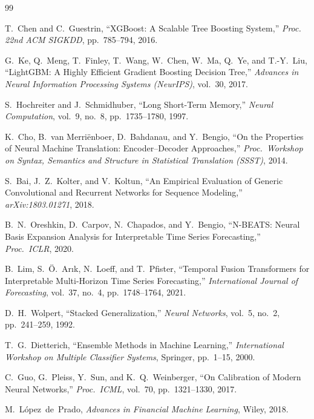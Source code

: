 \clearpage
\begin{thebibliography}{99}

T.~Chen and C.~Guestrin, ``XGBoost: A Scalable Tree Boosting System,'' \textit{Proc. 22nd ACM SIGKDD}, pp.~785--794, 2016.

G.~Ke, Q.~Meng, T.~Finley, T.~Wang, W.~Chen, W.~Ma, Q.~Ye, and T.-Y.~Liu, ``LightGBM: A Highly Efficient Gradient Boosting Decision Tree,'' \textit{Advances in Neural Information Processing Systems (NeurIPS)}, vol.~30, 2017.

S.~Hochreiter and J.~Schmidhuber, ``Long Short-Term Memory,'' \textit{Neural Computation}, vol.~9, no.~8, pp.~1735--1780, 1997.

K.~Cho, B.~van Merri\"enboer, D.~Bahdanau, and Y.~Bengio, ``On the Properties of Neural Machine Translation: Encoder--Decoder Approaches,'' \textit{Proc.\ Workshop on Syntax, Semantics and Structure in Statistical Translation (SSST)}, 2014.

S.~Bai, J.~Z.~Kolter, and V.~Koltun, ``An Empirical Evaluation of Generic Convolutional and Recurrent Networks for Sequence Modeling,'' \textit{arXiv:1803.01271}, 2018.

B.~N.~Oreshkin, D.~Carpov, N.~Chapados, and Y.~Bengio, ``N-BEATS: Neural Basis Expansion Analysis for Interpretable Time Series Forecasting,'' \textit{Proc.\ ICLR}, 2020.

B.~Lim, S.~\"O.~Ar\i k, N.~Loeff, and T.~Pfister, ``Temporal Fusion Transformers for Interpretable Multi-Horizon Time Series Forecasting,'' \textit{International Journal of Forecasting}, vol.~37, no.~4, pp.~1748--1764, 2021.

D.~H.~Wolpert, ``Stacked Generalization,'' \textit{Neural Networks}, vol.~5, no.~2, pp.~241--259, 1992.

T.~G.~Dietterich, ``Ensemble Methods in Machine Learning,'' \textit{International Workshop on Multiple Classifier Systems}, Springer, pp.~1--15, 2000.

C.~Guo, G.~Pleiss, Y.~Sun, and K.~Q.~Weinberger, ``On Calibration of Modern Neural Networks,'' \textit{Proc.\ ICML}, vol.~70, pp.~1321--1330, 2017.

M.~L\'opez~de~Prado, \textit{Advances in Financial Machine Learning}, Wiley, 2018.


\end{thebibliography}
